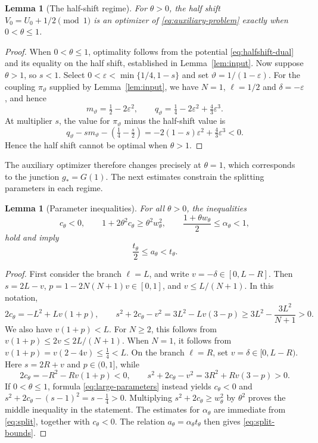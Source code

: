 \documentclass{article}
\newtheorem{lemma}[theorem]{Lemma}
\theoremstyle{definition}
\theoremstyle{remark}
\newcommand{\1}{\mathds{1}}
\begin{document}
\begin{lemma}[The half-shift regime]\label{lem:halfshift-range}
For $\theta>0$, the half shift $V_0=U_0+1/2\pmod1$ is an optimizer of \eqref{eq:auxiliary-problem} exactly when $0<\theta\le1$.
\end{lemma}

\begin{proof}
When $0<\theta\le1$, optimality follows from the potential \eqref{eq:halfshift-dual} and its equality on the half shift, established in Lemma~\ref{lem:input}.
Now suppose $\theta>1$, so $s<1$. Select $0<\varepsilon<\min\{1/4,1-s\}$
and set $\vartheta=1/(1-\varepsilon)$. For the coupling $\pi_\vartheta$ supplied by
Lemma~\ref{lem:input}, we have $N=1$, $\ell=1/2$ and $\delta=-\varepsilon$, and hence
\[
m_\vartheta=\tfrac12-2\varepsilon^2,\qquad
q_\vartheta=\tfrac14-2\varepsilon^2+\tfrac43\varepsilon^3.
\]
At multiplier $s$, the value for $\pi_\vartheta$ minus the half-shift value is
\[
q_\vartheta-s m_\vartheta-(\tfrac14-\tfrac s2)
=-2(1-s)\varepsilon^2+\tfrac43\varepsilon^3<0.
\]
Hence the half shift cannot be optimal when $\theta>1$.
\end{proof}

The auxiliary optimizer therefore changes precisely at $\theta=1$, which
corresponds to the junction $g_*=G(1)$. The next estimates constrain the
splitting parameters in each regime.

\begin{lemma}[Parameter inequalities]\label{lem:parameter-checks}
	For all $\theta>0$, the inequalities
	\[
		c_\theta<0,\qquad1+2\theta^2c_\theta\ge\theta^2w_\theta^2,\qquad
		\frac{1+\theta w_\theta}{2}\le\alpha_\theta<1,
	\]
	hold and imply
	\begin{equation}\label{eq:split-bounds}
		\frac{t_\theta}{2}\le a_\theta<t_\theta.
	\end{equation}
\end{lemma}

\begin{proof}
	First consider the branch $\ell=L$, and write $v=-\delta\in[0,L-R]$. Then $s=2L-v$, $p=1-2N(N+1)v\in[0,1]$, and $v\le L/(N+1)$.
	In this notation,
	\[
		2c_\theta=-L^2+Lv(1+p),\qquad
		s^2+2c_\theta-v^2=3L^2-Lv(3-p)\ge3L^2-\frac{3L^2}{N+1}>0.
	\]
	We also have $v(1+p)<L$. For $N\ge2$, this follows from $v(1+p)\le2v\le2L/(N+1)$. When $N=1$, it follows from $v(1+p)=v(2-4v)\le\tfrac14<L$.
	On the branch $\ell=R$, set $v=\delta\in[0,L-R)$. Here $s=2R+v$ and $p\in(0,1]$, while
	\[
		2c_\theta=-R^2-Rv(1+p)<0,\qquad
		s^2+2c_\theta-v^2=3R^2+Rv(3-p)>0.
	\]
	If $0<\theta\le1$, formula \eqref{eq:large-parameters} instead yields $c_\theta<0$ and $s^2+2c_\theta-(s-1)^2=s-\tfrac14>0$.
	Multiplying $s^2+2c_\theta\ge w_\theta^2$ by $\theta^2$ proves the middle inequality in the statement.
	The estimates for $\alpha_\theta$ are immediate from \eqref{eq:split}, together with $c_\theta<0$.
	The relation $a_\theta=\alpha_\theta t_\theta$ then gives \eqref{eq:split-bounds}.
\end{proof}
\end{document}
